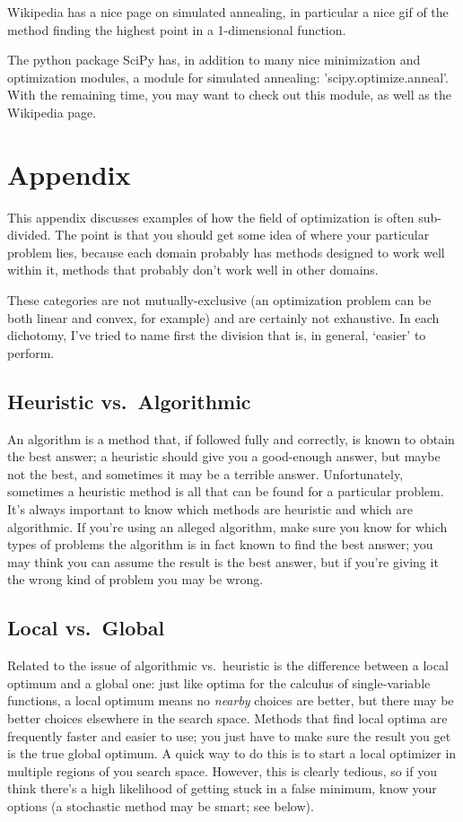 \documentclass{article}
\begin{document}
  Wikipedia has a nice page on simulated annealing, in particular
  a nice gif of the method finding the highest point in a
  1-dimensional function.

  The python package SciPy has, in addition to many nice 
  minimization and optimization modules, a module for
  simulated annealing: 'scipy.optimize.anneal'. With the
  remaining time, you may want to check out this module,
  as well as the Wikipedia page.

\section*{Appendix}
	This appendix discusses examples of how the field of optimization is often
	sub-divided. The point is that you should get some idea of
	where your particular 
	problem lies, because each domain probably has methods designed to work well
	within it, methods that probably don't work well in other domains.
	
	These categories are not mutually-exclusive (an optimization
	problem can be both linear and convex, for example) and are certainly
	not exhaustive. In each dichotomy,
	I've tried to name first the division that is, in general, `easier' to perform.

  \subsection*{Heuristic vs.\ Algorithmic}
		An algorithm is a method that, if followed fully and correctly,
		is known to obtain the best answer; a heuristic should give you
		a good-enough answer, but maybe not the best, and sometimes it
		may be a terrible answer.
		Unfortunately, sometimes a heuristic method is all that can be
		found for a particular problem.
		It's always important to know which methods
		are heuristic and which are algorithmic. If you're using an alleged algorithm,
		make sure you know for which types of problems the algorithm is in fact
		known to find the best answer; you may think you can assume
		the result is the best answer, but if you're giving it the wrong kind
		of problem you may be wrong.

  \subsection*{Local vs.\ Global}
		Related to the issue of algorithmic vs.\ heuristic is the difference 
		between a local optimum and a global one: 
		just like optima for the calculus of single-variable
		functions, a local optimum means no \emph{nearby} choices
		are better, but there may be better choices elsewhere in the search space.
		Methods that find local optima are frequently faster and easier to use;
		you just have to make sure the result you get is the true global
		optimum. A quick way to do this is to start a local optimizer in multiple
		regions of you search space. However, this is clearly tedious, so if you
		think there's a high likelihood of getting stuck in a false minimum,
		know your options (a stochastic method may be smart; see below).
\end{document}
